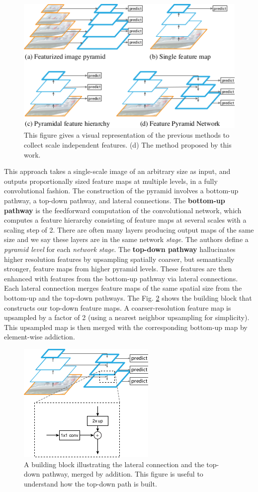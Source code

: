 \begin{figure}[h!]
	\centering
	\includegraphics[width=0.5\linewidth]{images/pyramid.png}
	\caption{This figure gives a visual representation of the previous methods to collect scale independent features. (d) The method proposed by this work.}
	\label{fig:pyramids}
\end{figure}


This approach takes a single-scale image of an arbitrary size as input, and outputs proportionally sized feature maps at multiple levels, in a fully convolutional fashion. The construction of the pyramid involves a bottom-up pathway, a top-down pathway, and lateral connections. The \textbf{bottom-up pathway} is the feedforward computation of the convolutional network, which computes a feature hierarchy consisting of feature maps at several scales with a scaling step of 2. There are often many layers producing output maps of the same size and we say
these layers are in the same network \textit{stage}. The authors define a \textit{pyramid level} for each \textit{network stage}. The \textbf{top-down pathway} hallucinates higher resolution features by
upsampling spatially coarser, but semantically stronger, feature maps from higher pyramid levels. These features are
then enhanced with features from the bottom-up pathway
via lateral connections. Each lateral connection merges feature maps of the same spatial size from the bottom-up and the top-down pathways. 
The Fig. \ref{fig:topdownpath} shows the building block that constructs our top-down feature maps. A coarser-resolution feature map is upsampled by a factor of 2 (using a nearest neighbor upsampling for simplicity). This upsampled map is then merged with the corresponding bottom-up map by element-wise addiction.

\begin{figure}[h!]
	\centering
	\includegraphics[width=0.5\linewidth]{images/topdownpath.png}
	\caption{A building block illustrating the lateral connection and
		the top-down pathway, merged by addition. This figure is useful to understand how the top-down path is built.}
	\label{fig:topdownpath}
\end{figure}

